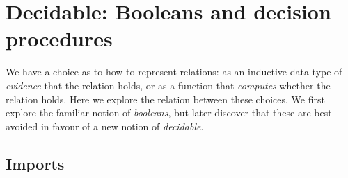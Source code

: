 \hypertarget{Decidable}{%
\chapter{Decidable: Booleans and decision procedures}\label{Decidable}}

\begin{fence}
\begin{code}%
\>[0]\AgdaSpace{}%
\AgdaSpace{}%
\<%
\end{code}
\end{fence}

We have a choice as to how to represent relations: as an inductive data
type of \emph{evidence} that the relation holds, or as a function that
\emph{computes} whether the relation holds. Here we explore the relation
between these choices. We first explore the familiar notion of
\emph{booleans}, but later discover that these are best avoided in
favour of a new notion of \emph{decidable}.

\hypertarget{imports}{%
\section{Imports}\label{imports}}

